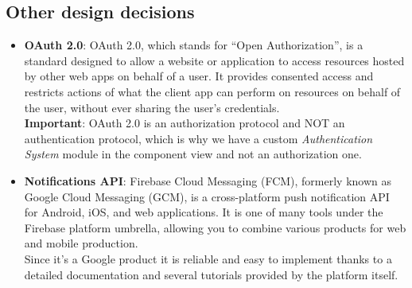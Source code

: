 \documentclass[11pt,twoside]{article}
\begin{document}
	\subsection{Other design decisions}
\begin{itemize}
\item \textbf{OAuth 2.0}: OAuth 2.0, which stands for “Open Authorization”, is a standard designed to allow a website or application to access resources hosted by other web apps on behalf of a user. It provides consented access and restricts actions of what the client app can perform on resources on behalf of the user, without ever sharing the user's credentials.\\
\textbf{Important}: OAuth 2.0 is an authorization protocol and NOT an authentication protocol, which is why we have a custom \textit{Authentication System} module in the component view and not an authorization one.
\item \textbf{Notifications API}: Firebase Cloud Messaging (FCM), formerly known as Google Cloud Messaging (GCM), is a cross-platform push notification API for Android, iOS, and web applications. It is one of many tools under the Firebase platform umbrella, allowing you to combine various products for web and mobile production.\\
Since it's a Google product it is reliable and easy to implement thanks to a detailed documentation and several tutorials provided by the platform itself.
\end{itemize}

\newpage
\end{document}
